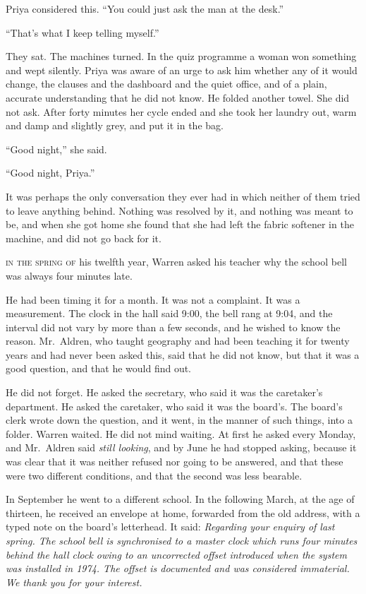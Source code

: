Priya considered this. ``You could just ask the man at the desk.''

``That's what I keep telling myself.''

They sat. The machines turned. In the quiz programme a woman won something and wept silently. Priya was aware of an urge to ask him whether any of it would change, the clauses and the dashboard and the quiet office, and of a plain, accurate understanding that he did not know. He folded another towel. She did not ask. After forty minutes her cycle ended and she took her laundry out, warm and damp and slightly grey, and put it in the bag.

``Good night,'' she said.

``Good night, Priya.''

It was perhaps the only conversation they ever had in which neither of them tried to leave anything behind. Nothing was resolved by it, and nothing was meant to be, and when she got home she found that she had left the fabric softener in the machine, and did not go back for it.


\textsc{in the spring of} his twelfth year, Warren asked his teacher why the school bell was always four minutes late.

He had been timing it for a month. It was not a complaint. It was a measurement. The clock in the hall said 9:00, the bell rang at 9:04, and the interval did not vary by more than a few seconds, and he wished to know the reason. Mr.~Aldren, who taught geography and had been teaching it for twenty years and had never been asked this, said that he did not know, but that it was a good question, and that he would find out.

He did not forget. He asked the secretary, who said it was the caretaker's department. He asked the caretaker, who said it was the board's. The board's clerk wrote down the question, and it went, in the manner of such things, into a folder. Warren waited. He did not mind waiting. At first he asked every Monday, and Mr.~Aldren said \emph{still looking}, and by June he had stopped asking, because it was clear that it was neither refused nor going to be answered, and that these were two different conditions, and that the second was less bearable.

In September he went to a different school. In the following March, at the age of thirteen, he received an envelope at home, forwarded from the old address, with a typed note on the board's letterhead. It said: \emph{Regarding your enquiry of last spring. The school bell is synchronised to a master clock which runs four minutes behind the hall clock owing to an uncorrected offset introduced when the system was installed in 1974. The offset is documented and was considered immaterial. We thank you for your interest.}

